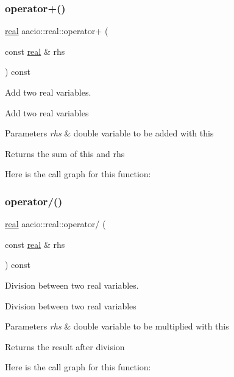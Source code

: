 \subsubsection{\texorpdfstring{operator+()}{operator+()}}
{\footnotesize\ttfamily \mbox{\hyperlink{classaacio_1_1real}{real}} aacio\+::real\+::operator+ (\begin{DoxyParamCaption}\item[{const \mbox{\hyperlink{classaacio_1_1real}{real}} \&}]{rhs }\end{DoxyParamCaption}) const}



Add two real variables. 

Add two real variables 
\begin{DoxyParams}{Parameters}
{\em rhs} & double variable to be added with this \\
\hline
\end{DoxyParams}
\begin{DoxyReturn}{Returns}
the sum of this and rhs 
\end{DoxyReturn}
Here is the call graph for this function\+:
\mbox{\label{group__real_gaaedf18a9e2e314ff892f7f942b09cbcf}} 
\subsubsection{\texorpdfstring{operator/()}{operator/()}}
{\footnotesize\ttfamily \mbox{\hyperlink{classaacio_1_1real}{real}} aacio\+::real\+::operator/ (\begin{DoxyParamCaption}\item[{const \mbox{\hyperlink{classaacio_1_1real}{real}} \&}]{rhs }\end{DoxyParamCaption}) const}



Division between two real variables. 

Division between two real variables 
\begin{DoxyParams}{Parameters}
{\em rhs} & double variable to be multiplied with this \\
\hline
\end{DoxyParams}
\begin{DoxyReturn}{Returns}
the result after division 
\end{DoxyReturn}
Here is the call graph for this function\+:
\mbox{\label{group__real_gaef11411f358f9f1a3b8c8e52fdf3c5f3}} 
